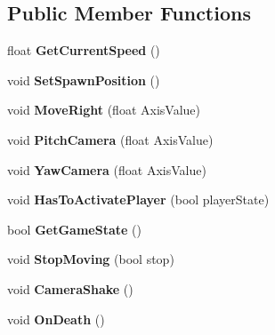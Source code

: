 \subsection*{Public Member Functions}
\begin{DoxyCompactItemize}
\item 
\mbox{\label{class_a_temp_player_abab7604d240b01a6b4643d4ab1715acd}} 
float {\bfseries Get\+Current\+Speed} ()
\item 
\mbox{\label{class_a_temp_player_ae2657c5780e4384b6281f1857094c3c6}} 
void {\bfseries Set\+Spawn\+Position} ()
\item 
\mbox{\label{class_a_temp_player_a08782176ec3f528f7057ff989857b6a9}} 
void {\bfseries Move\+Right} (float Axis\+Value)
\item 
\mbox{\label{class_a_temp_player_aac043860b6aa360464446dd85d6b6ff8}} 
void {\bfseries Pitch\+Camera} (float Axis\+Value)
\item 
\mbox{\label{class_a_temp_player_a07da2545da43089739937bde60d8bfbc}} 
void {\bfseries Yaw\+Camera} (float Axis\+Value)
\item 
\mbox{\label{class_a_temp_player_a1702f6989e281436ffd6714c30081c10}} 
void {\bfseries Has\+To\+Activate\+Player} (bool player\+State)
\item 
\mbox{\label{class_a_temp_player_a50ca9988a356376957e52098b3d271e3}} 
bool {\bfseries Get\+Game\+State} ()
\item 
\mbox{\label{class_a_temp_player_a542e0b12e5b9df0a7d53365d99435b45}} 
void {\bfseries Stop\+Moving} (bool stop)
\item 
\mbox{\label{class_a_temp_player_a49cbf48c04c0afabf76a56ad1466a5c2}} 
void {\bfseries Camera\+Shake} ()
\item 
\mbox{\label{class_a_temp_player_aee1e2803664bcd04a5e91d6137b5eedc}} 
void {\bfseries On\+Death} ()
\item 
\mbox{\label{class_a_temp_player_a0520be909f24bfd151c47519b599ba99}} 

\end{DoxyCompactItemize}
